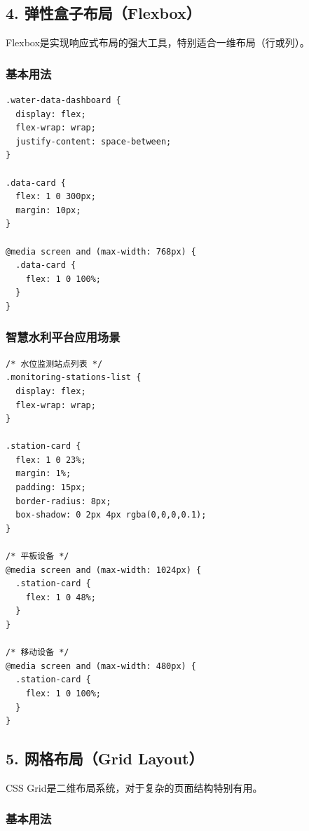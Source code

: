 \subsection{4.
弹性盒子布局（Flexbox）}\label{ux5f39ux6027ux76d2ux5b50ux5e03ux5c40flexbox}

Flexbox是实现响应式布局的强大工具，特别适合一维布局（行或列）。

\subsubsection{基本用法}\label{ux57faux672cux7528ux6cd5}

\begin{lstlisting}
.water-data-dashboard {
  display: flex;
  flex-wrap: wrap;
  justify-content: space-between;
}

.data-card {
  flex: 1 0 300px;
  margin: 10px;
}

@media screen and (max-width: 768px) {
  .data-card {
    flex: 1 0 100%;
  }
}
\end{lstlisting}

\subsubsection{智慧水利平台应用场景}\label{ux667aux6167ux6c34ux5229ux5e73ux53f0ux5e94ux7528ux573aux666f}

\begin{lstlisting}
/* 水位监测站点列表 */
.monitoring-stations-list {
  display: flex;
  flex-wrap: wrap;
}

.station-card {
  flex: 1 0 23%;
  margin: 1%;
  padding: 15px;
  border-radius: 8px;
  box-shadow: 0 2px 4px rgba(0,0,0,0.1);
}

/* 平板设备 */
@media screen and (max-width: 1024px) {
  .station-card {
    flex: 1 0 48%;
  }
}

/* 移动设备 */
@media screen and (max-width: 480px) {
  .station-card {
    flex: 1 0 100%;
  }
}
\end{lstlisting}

\subsection{5. 网格布局（Grid
Layout）}\label{ux7f51ux683cux5e03ux5c40grid-layout}

CSS Grid是二维布局系统，对于复杂的页面结构特别有用。

\subsubsection{基本用法}\label{ux57faux672cux7528ux6cd5-1}

